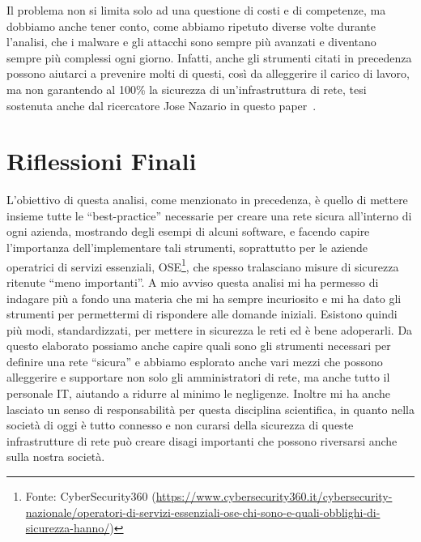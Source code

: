         Il problema non si limita solo ad una questione di costi e di competenze, ma dobbiamo anche tener conto, come abbiamo ripetuto diverse volte durante l'analisi, che i malware e gli attacchi sono sempre più avanzati e diventano sempre più complessi ogni giorno. Infatti, anche gli strumenti citati in precedenza possono aiutarci a prevenire molti di questi, così da alleggerire il carico di lavoro, ma non garantendo al 100\% la sicurezza di un'infrastruttura di rete, tesi sostenuta anche dal ricercatore Jose Nazario in questo paper~\cite{never_ending_loop_conclusions}.



    \section{Riflessioni Finali}
        L'obiettivo di questa analisi, come menzionato in precedenza, è quello di mettere insieme tutte le “best-practice” necessarie per creare una rete sicura all'interno di ogni azienda, mostrando degli esempi di alcuni software, e facendo capire l'importanza dell'implementare tali strumenti, soprattutto per le aziende operatrici di servizi essenziali, OSE\footnote{Fonte: CyberSecurity360 (\url{https://www.cybersecurity360.it/cybersecurity-nazionale/operatori-di-servizi-essenziali-ose-chi-sono-e-quali-obblighi-di-sicurezza-hanno/})}, che spesso tralasciano misure di sicurezza ritenute “meno importanti”. A mio avviso questa analisi mi ha permesso di indagare più a fondo una materia che mi ha sempre incuriosito e mi ha dato gli strumenti per permettermi di rispondere alle domande iniziali. Esistono quindi più modi, standardizzati, per mettere in sicurezza le reti ed è bene adoperarli. Da questo elaborato possiamo anche capire quali sono gli strumenti necessari per definire una rete “sicura” e abbiamo esplorato anche vari mezzi che possono alleggerire e supportare non solo gli amministratori di rete, ma anche tutto il personale IT, aiutando a ridurre al minimo le negligenze. Inoltre mi ha anche lasciato un senso di responsabilità per questa disciplina scientifica, in quanto nella società di oggi è tutto connesso e non curarsi della sicurezza di queste infrastrutture di rete può creare disagi importanti che possono riversarsi anche sulla nostra società.